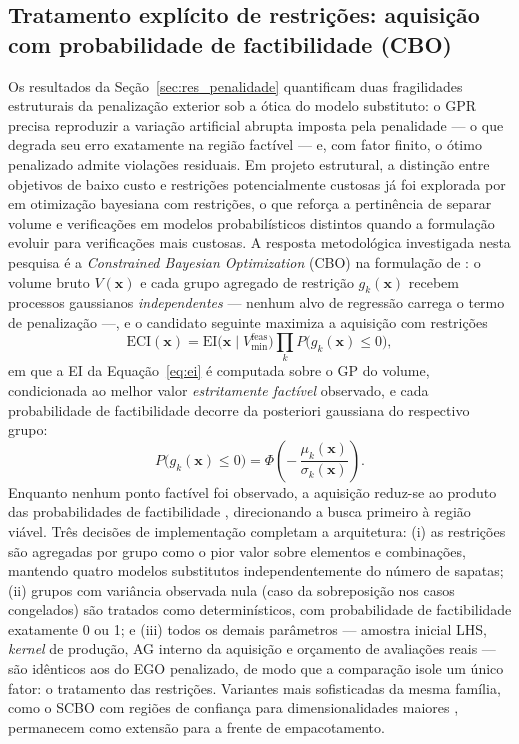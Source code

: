 \subsection{Tratamento explícito de restrições: aquisição com probabilidade de factibilidade (CBO)}
\label{sec:met_cbo}

Os resultados da Seção~\ref{sec:res_penalidade} quantificam duas fragilidades estruturais da penalização exterior sob a ótica do modelo substituto: o GPR precisa reproduzir a variação artificial abrupta imposta pela penalidade — o que degrada seu erro exatamente na região factível — e, com fator finito, o ótimo penalizado admite violações residuais. Em projeto estrutural, a distinção entre objetivos de baixo custo e restrições potencialmente custosas já foi explorada por  em otimização bayesiana com restrições, o que reforça a pertinência de separar volume e verificações em modelos probabilísticos distintos quando a formulação evoluir para verificações mais custosas. A resposta metodológica investigada nesta pesquisa é a \textit{Constrained Bayesian Optimization} (CBO) na formulação de : o volume bruto $V(\bm{x})$ e cada grupo agregado de restrição $g_k(\bm{x})$ recebem processos gaussianos \textit{independentes} — nenhum alvo de regressão carrega o termo de penalização —, e o candidato seguinte maximiza a aquisição com restrições
\begin{equation}
    \mathrm{ECI}(\bm{x}) = \mathrm{EI}\bigl(\bm{x} \mid V_{\min}^{\mathrm{feas}}\bigr)
    \prod_{k} P\bigl(g_k(\bm{x}) \le 0\bigr),
    \label{eq:eci}
\end{equation}
em que a EI da Equação~\eqref{eq:ei} é computada sobre o GP do volume, condicionada ao melhor valor \textit{estritamente factível} observado, e cada probabilidade de factibilidade decorre da posteriori gaussiana do respectivo grupo:
\begin{equation}
    P\bigl(g_k(\bm{x}) \le 0\bigr) = \Phi\!\left(-\,\dfrac{\mu_k(\bm{x})}{\sigma_k(\bm{x})}\right).
    \label{eq:pof}
\end{equation}
Enquanto nenhum ponto factível foi observado, a aquisição reduz-se ao produto das probabilidades de factibilidade , direcionando a busca primeiro à região viável. Três decisões de implementação completam a arquitetura: (i) as restrições são agregadas por grupo como o pior valor sobre elementos e combinações, mantendo quatro modelos substitutos independentemente do número de sapatas; (ii) grupos com variância observada nula (caso da sobreposição nos casos congelados) são tratados como determinísticos, com probabilidade de factibilidade exatamente 0 ou 1; e (iii) todos os demais parâmetros — amostra inicial LHS, \textit{kernel} de produção, AG interno da aquisição e orçamento de avaliações reais — são idênticos aos do EGO penalizado, de modo que a comparação isole um único fator: o tratamento das restrições. Variantes mais sofisticadas da mesma família, como o SCBO com regiões de confiança para dimensionalidades maiores , permanecem como extensão para a frente de empacotamento.

